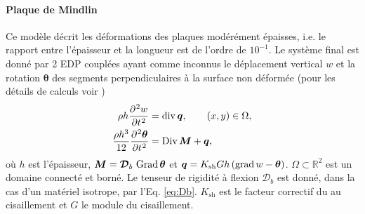 \paragraph{Plaque de Mindlin}
Ce modèle décrit les déformations des plaques modérément épaisses, i.e. le rapport entre l'épaisseur et la longueur est de l'ordre de $10^{-1}$. Le système final est donné par 2 EDP couplées ayant comme inconnus le déplacement vertical $w$ et la rotation $\bm{\theta}$ des segments perpendiculaires à la surface non déformée (pour les détails de calculs voir \cite[Chapter 10]{reddy2006theory})
\begin{equation*}
\begin{aligned}
\rho h \diffp[2]{w}{t} &= \div \bm{q}, \qquad (x,y) \in \Omega, \\
\frac{\rho h^3}{12} \diffp[2]{\bm{\theta}}{t} &=\Div \bm{M} + \bm{q},
\end{aligned}
\end{equation*}
où $h$ est l'épaisseur, $\bm{M}= \bm{\mathcal{D}}_b\,\operatorname*{Grad}{\bm{\theta}}$ et $\bm{q}= K_{\text{sh}} Gh\,(\operatorname*{grad} w - \bm{\theta})$. $\Omega \subset \mathbb{R}^2$ est un domaine connecté et borné. Le tenseur de rigidité à flexion $\bm{\mathcal{D}}_b$ est donné, dans la cas d'un matériel isotrope, par l'Eq. \eqref{eq:Db}. $K_{\text{sh}}$ est le facteur correctif du au cisaillement et $G$ le module du cisaillement.

